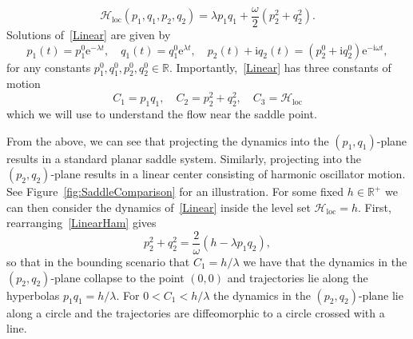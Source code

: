 \documentclass[11pt]{article}
\numberwithin{equation}{section}
\theoremstyle{plain}
\begin{document}
\begin{equation}\label{LinearHam}
	\mathcal{H}_\mathrm{loc}(p_1,q_1,p_2,q_2) = \lambda p_1q_1 + \frac{\omega}{2}(p_2^2 + q_2^2).
\end{equation} 
Solutions of~\eqref{Linear} are given by
\begin{equation}\label{LinearSol}
	p_1(t) = p_1^0\mathrm{e}^{-\lambda t}, \quad q_1(t) = q_1^0\mathrm{e}^{\lambda t}, \quad p_2(t) + \mathrm{i}q_2(t) = (p_2^0 + \mathrm{i}q_2^0)\mathrm{e}^{-\mathrm{i}\omega t}, 
\end{equation}
for any constants $p_1^0,q_1^0,p_2^0,q_2^0\in\mathbb{R}$. Importantly,~\eqref{Linear} has three constants of motion
\begin{equation}
	C_1 = p_1q_1, \quad C_2 = p_2^2 + q_2^2, \quad C_3 = \mathcal{H}_\mathrm{loc}
\end{equation}
which we will use to understand the flow near the saddle point.

From the above, we can see that projecting the dynamics into the $(p_1,q_1)$-plane results in a standard planar saddle system. Similarly, projecting into the $(p_2,q_2)$-plane results in a linear center consisting of harmonic oscillator motion. See Figure~\ref{fig:SaddleComparison} for an illustration. For some fixed $h \in \mathbb{R}^+$ we can then consider the dynamics of~\eqref{Linear} inside the level set $\mathcal{H}_\mathrm{loc} = h$. First, rearranging~\eqref{LinearHam} gives
\begin{equation}
	p_2^2 + q_2^2 = \frac{2}{\omega}(h - \lambda p_1q_2),
\end{equation}
so that in the bounding scenario that $C_1 = h/\lambda$ we have that the dynamics in the $(p_2,q_2)$-plane collapse to the point $(0,0)$ and trajectories lie along the hyperbolas $p_1q_1 = h/\lambda$. For $0 < C_1 < h/\lambda$ the dynamics in the $(p_2,q_2)$-plane lie along a circle and the trajectories are diffeomorphic to a circle crossed with a line. 
\end{document}

